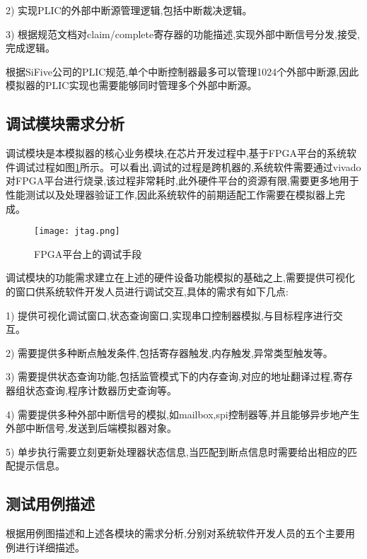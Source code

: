 2) 实现PLIC的外部中断源管理逻辑,包括中断裁决逻辑。


3) 根据规范文档对claim/complete寄存器的功能描述,实现外部中断信号分发,接受,完成逻辑。


根据SiFive公司的PLIC规范,单个中断控制器最多可以管理1024个外部中断源,因此模拟器的PLIC实现也需要能够同时管理多个外部中断源。


\subsection{调试模块需求分析}
调试模块是本模拟器的核心业务模块,在芯片开发过程中,基于FPGA平台的系统软件调试过程如图\ref{fig:jtag}所示。可以看出,调试的过程是跨机器的,系统软件需要通过vivado对FPGA平台进行烧录,该过程非常耗时,此外硬件平台的资源有限,需要更多地用于性能测试以及处理器验证工作,因此系统软件的前期适配工作需要在模拟器上完成。

\begin{figure}[H]
  \centering
  \texttt{[image: jtag.png]}
  \caption{FPGA平台上的调试手段}
  \label{fig:jtag}
\end{figure}

调试模块的功能需求建立在上述的硬件设备功能模拟的基础之上,需要提供可视化的窗口供系统软件开发人员进行调试交互,具体的需求有如下几点:


1) 提供可视化调试窗口,状态查询窗口,实现串口控制器模拟,与目标程序进行交互。


2) 需要提供多种断点触发条件,包括寄存器触发,内存触发,异常类型触发等。


3) 需要提供状态查询功能,包括监管模式下的内存查询,对应的地址翻译过程,寄存器组状态查询,程序计数器历史查询等。


4) 需要提供多种外部中断信号的模拟,如mailbox,spi控制器等,并且能够异步地产生外部中断信号,发送到后端模拟器对象。


5) 单步执行需要立刻更新处理器状态信息,当匹配到断点信息时需要给出相应的匹配提示信息。

\subsection{测试用例描述}

根据用例图描述和上述各模块的需求分析,分别对系统软件开发人员的五个主要用例进行详细描述。 


